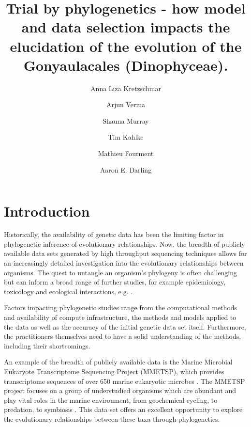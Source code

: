 \documentclass[fleqn,10pt,lineno]{wlpeerj} %
\title{Trial by phylogenetics - how model and data selection impacts the elucidation of the evolution of the Gonyaulacales (Dinophyceae).}
\author[1]{Anna Liza Kretzschmar}
\author[2]{Arjun Verma}
\author[2]{Shauna Murray}
\author[2]{Tim Kahlke}
\author[1]{Mathieu Fourment}
\author[1]{Aaron E. Darling}
\affil[1]{The ithree institute, University of Technology Sydney, Australia}
\affil[2]{c3, University of Technology Sydney, Australia}
\begin{document}
\flushbottom
\maketitle
\thispagestyle{empty}

\section*{Introduction}
Historically, the availability of genetic data has been the limiting factor in phylogenetic inference of evolutionary relationships.
Now, the breadth of publicly available data sets generated by high throughput sequencing techniques allows for an increasingly detailed investigation into the evolutionary relationships between organisms.
The quest to untangle an organism's phylogeny is often challenging but can inform a broad range of further studies, for example epidemiology, toxicology and ecological interactions, e.g. \citep{mctavish2017and,lewis2008episodic,mutreja2011evidence,cavender2009merging,sites2011phylogenetic}.

Factors impacting phylogenetic studies range from the computational methods and availability of compute infrastructure, the methods and models applied to the data as well as the accuracy of the initial genetic data set itself.
Furthermore, the practitioners themselves need to have a solid understanding of the methods, including their shortcomings.

An example of the breadth of publicly available data is the Marine Microbial Eukaryote Transcriptome Sequencing Project (MMETSP), which provides transcriptome sequences of over 650 marine eukaryotic microbes \citep{keeling2014marine}. 
The MMETSP project focuses on a group of understudied organisms which are abundant and play vital roles in the marine environment, from geochemical cycling, to predation, to symbiosis \citep{gomez2005list,gomez2012quantitative}. 
This data set offers an excellent opportunity to explore the evolutionary relationships between these taxa through phylogenetics. 
\end{document}
